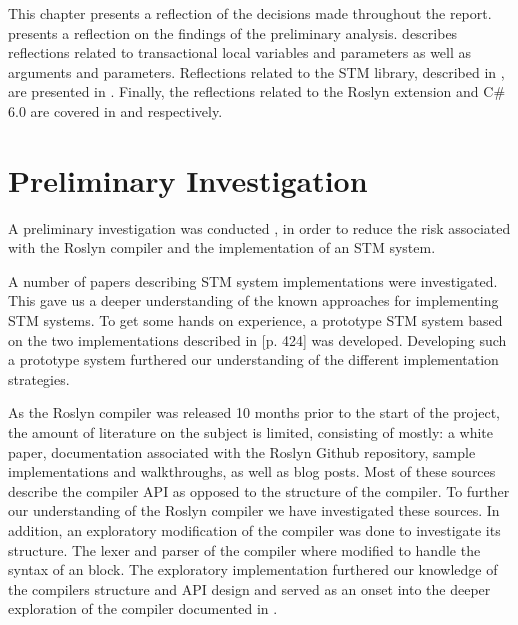 \makeatletter {}\makeatother
{}
\label{chap:reflection}
This chapter presents a reflection of the decisions made throughout the report.  presents a reflection on the findings of the preliminary analysis.  describes reflections related to transactional local variables and parameters as well as  arguments and parameters. Reflections related to the \ac{STM} library, described in , are presented in . Finally, the reflections related to the Roslyn extension and C\# 6.0 are covered in  and  respectively. 

\section{Preliminary Investigation}\label{sec:reflection_preliminary}
A preliminary investigation was conducted , in order to reduce the risk associated with the Roslyn compiler and the implementation of an \ac{STM} system. 

A number of papers describing \ac{STM} system implementations were investigated. This gave us a deeper understanding of the known approaches for implementing \ac{STM} systems. To get some hands on experience, a prototype \ac{STM} system based on the two implementations described in \cite{herlihy2012art}[p. 424] was developed. Developing such a prototype system furthered our understanding of the different implementation strategies.

As the Roslyn compiler was released 10 months prior to the start of the project, the amount of literature on the subject is limited, consisting of mostly: a white paper\cite{ng2012roslyn}, documentation associated with the Roslyn Github repository\cite{roslynwiki}, sample implementations and walkthroughs\cite{roslynsamples}, as well as blog posts. Most of these sources describe the compiler \ac{API} as opposed to the structure of the compiler. To further our understanding of the Roslyn compiler we have investigated these sources. In addition, an exploratory modification of the compiler was done to investigate its structure. The lexer and parser of the compiler where modified to handle the syntax of an  block. The exploratory implementation furthered our knowledge of the compilers structure and \ac{API} design and served as an onset into the deeper exploration of the compiler documented in .

